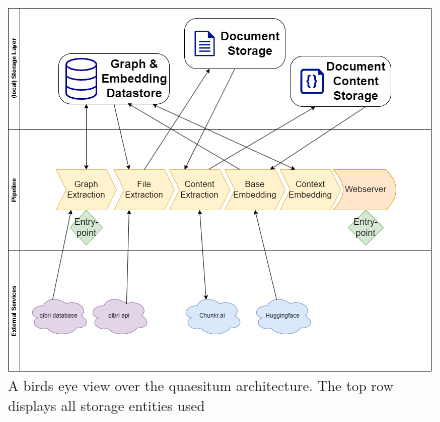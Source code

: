 \documentclass[draft,final]{vutinfth} %
\begin{document}
\begin{figure}
    \centering
    \includegraphics[width=1.0\linewidth]{graphics/quaesitum-arch.png}
    \caption{A birds eye view over the quaesitum architecture. The top row displays all storage entities used }
    \label{fig:quaesitum-arch}
\end{figure}

 
\end{document}
